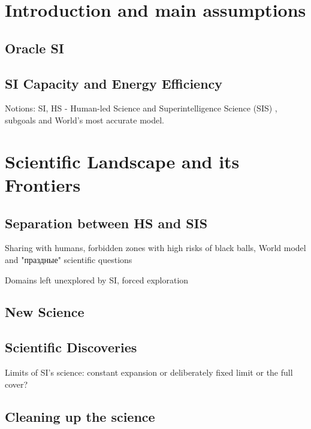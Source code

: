 \documentclass[a4paper,11pt]{article}
\begin{document}
\newpage

	\section{Introduction and main assumptions}

        \subsection{Oracle SI}

        \subsection{SI Capacity and Energy Efficiency}

        Notions: SI, HS - Human-led Science  and Superintelligence Science (SIS) , subgoals and World's most accurate model.

    \section{Scientific Landscape and its Frontiers}

        \subsection{Separation between HS and SIS}

        Sharing with humans, forbidden zones with high risks of black balls, World model and "праздные" scientific questions

        Domains left unexplored by SI, forced exploration

        \subsection{New Science}

        \subsection{Scientific Discoveries}

        Limits of SI's science: constant expansion or deliberately fixed limit or the full cover?

        \subsection{Cleaning up the science}
\end{document}

